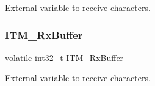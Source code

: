 External variable to receive characters. \mbox{\label{group___c_m_s_i_s__core___debug_functions_ga12e68e55a7badc271b948d6c7230b2a8}} 
\subsubsection{\texorpdfstring{I\+T\+M\+\_\+\+Rx\+Buffer}{ITM\_RxBuffer}\hspace{0.1cm}{\footnotesize\ttfamily [4/4]}}
{\footnotesize\ttfamily \hyperlink{semihosting_8h_a65e6ad7ed1b130fda2cf7f6a0861fca9}{volatile} int32\+\_\+t I\+T\+M\+\_\+\+Rx\+Buffer}

External variable to receive characters. 